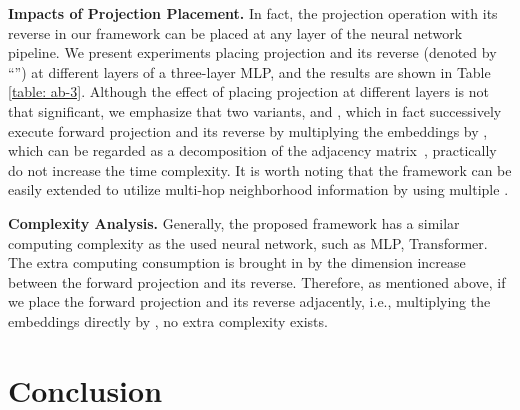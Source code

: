 \documentclass[review]{elsarticle}
\begin{document}
\textbf{Impacts of Projection Placement.} In fact, the projection operation with its reverse in our framework can be placed at any layer of the neural network pipeline. We present experiments placing projection and its reverse (denoted by ``'') at different layers of a three-layer MLP, and the results are shown in Table \ref{table: ab-3}. Although the effect of placing projection at different layers is not that significant, we emphasize that two variants,  and , which in fact successively execute forward projection and its reverse by multiplying the embeddings by , which can be regarded as a decomposition of the adjacency matrix~\cite{yang2015network,huang2017accelerated}, practically do not increase the time complexity. It is worth noting that the framework can be easily extended to utilize multi-hop neighborhood information by using multiple .

\begin{table}[htbp]
  \centering
  \caption{\textbf{Results of different projection placement.}}
  \label{table: ab-3}
\end{table}

\textbf{Complexity Analysis.} Generally, the proposed framework has a similar computing complexity as the used neural network, such as MLP, Transformer. The extra computing consumption is brought in by the dimension increase between the forward projection and its reverse. Therefore, as mentioned above, if we place the forward projection and its reverse adjacently, i.e., multiplying the embeddings directly by , no extra complexity exists.

\section{Conclusion}
\end{document}
